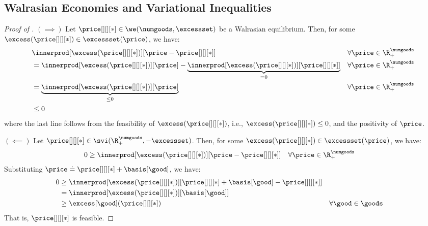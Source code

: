 \subsection{Walrasian Economies and Variational Inequalities}
\thmweequalsvi*
\begin{proof}[Proof of ]
    $(\implies)$
    Let $\price[][][*] \in \we(\numgoods, \excessset)$ be a Walrasian equilibrium. Then, for some $\excess(\price[][][*]) \in \excessset(\price)$, we have:
    \begin{align*}
        &\innerprod[{\excess(\price[][][*])}][{\price - \price[][][*]}] && \forall \price \in \R^\numgoods_+\\
        &= \innerprod[{\excess(\price[][][*])}][{\price}] - \underbrace{\innerprod[{\excess(\price[][][*])}][{\price[][][*] }]}_{= 0} && \forall \price \in \R^\numgoods_+\\
        &= \underbrace{\innerprod[{\excess(\price[][][*])}][{\price}]}_{\leq 0} && \forall \price \in \R^\numgoods_+\\
        &\leq 0
    \end{align*}
    where the last line follows from the feasibility of $\excess(\price[][][*])$, i.e., $\excess(\price[][][*]) \leq 0$, and the positivity of $\price$.

    $(\impliedby)$
    Let $\price[][][*] \in \svi(\R^\numgoods_+, -\excessset)$. Then, for some $\excess(\price[][][*]) \in \excessset(\price)$, we have:
    \begin{align*}
        0&\geq  \innerprod[{\excess(\price[][][*])}][{\price - \price[][][*]}] && \forall \price \in \R^\numgoods_+
    \end{align*}
    Substituting $\price \doteq \price[][][*] + \basis[\good]$, we have:
    \begin{align*}
        0 &\geq \innerprod[{\excess(\price[][][*])}][{\price[][][*] + \basis[\good] - \price[][][*]}]\\
        &= \innerprod[{\excess(\price[][][*])}][{\basis[\good]}]\\
        &\geq \excess[\good](\price[][][*]) && \forall \good \in \goods
    \end{align*}
    That is, $\price[][][*]$ is feasible.
    

\end{proof}

